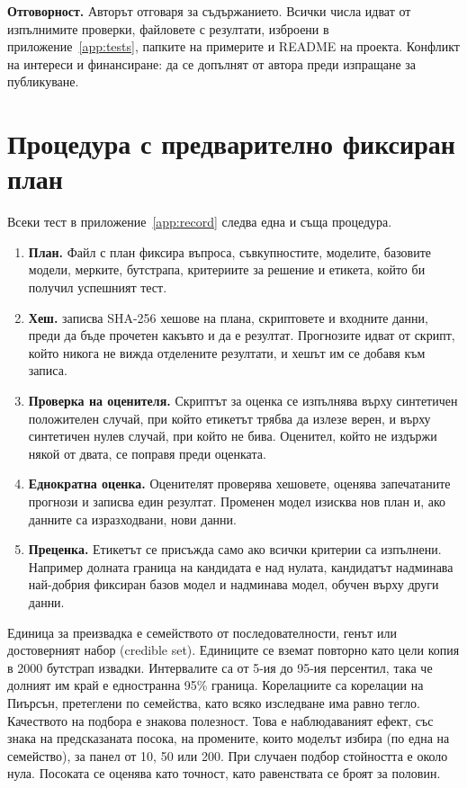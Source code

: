 \documentclass[10.5pt,a4paper]{article}
\begin{document}
\textbf{Отговорност.} Авторът отговаря за съдържанието. Всички числа идват от изпълнимите проверки, файловете с резултати, изброени в приложение~\ref{app:tests}, папките на примерите и README на проекта. Конфликт на интереси и финансиране: да се допълнят от автора преди изпращане за публикуване.



\appendix

\section{Процедура с предварително фиксиран план}\label{app:protocol}

Всеки тест в приложение~\ref{app:record} следва една и съща процедура.
\begin{enumerate}
\item \textbf{План.} Файл с план фиксира въпроса, съвкупностите, моделите, базовите модели, мерките, бутстрапа, критериите за решение и етикета, който би получил успешният тест.
\item \textbf{Хеш.}  записва SHA-256 хешове на плана, скриптовете и входните данни, преди да бъде прочетен какъвто и да е резултат. Прогнозите идват от скрипт, който никога не вижда отделените резултати, и хешът им се добавя към записа.
\item \textbf{Проверка на оценителя.} Скриптът за оценка се изпълнява върху синтетичен положителен случай, при който етикетът трябва да излезе верен, и върху синтетичен нулев случай, при който не бива. Оценител, който не издържи някой от двата, се поправя преди оценката.
\item \textbf{Еднократна оценка.} Оценителят проверява хешовете, оценява запечатаните прогнози и записва един резултат. Променен модел изисква нов план и, ако данните са изразходвани, нови данни.
\item \textbf{Преценка.} Етикетът се присъжда само ако всички критерии са изпълнени. Например долната граница на кандидата е над нулата, кандидатът надминава най-добрия фиксиран базов модел и надминава модел, обучен върху други данни.
\end{enumerate}

Единица за преизвадка е семейството от последователности, генът или достоверният набор (credible set). Единиците се вземат повторно като цели копия в 2000 бутстрап извадки. Интервалите са от 5-ия до 95-ия персентил, така че долният им край е едностранна 95\% граница. Корелациите са корелации на Пиърсън, претеглени по семейства, като всяко изследване има равно тегло. Качеството на подбора е знакова полезност. Това е наблюдаваният ефект, със знака на предсказаната посока, на промените, които моделът избира (по една на семейство), за панел от 10, 50 или 200. При случаен подбор стойността е около нула. Посоката се оценява като точност, като равенствата се броят за половин.
\end{document}
